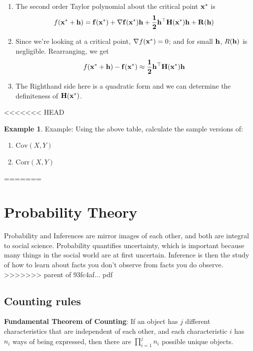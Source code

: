 \documentclass[]{book}
\providecommand{\tightlist}{%
  \setlength{\itemsep}{0pt}\setlength{\parskip}{0pt}}
\theoremstyle{definition}
\theoremstyle{definition}
\newtheorem{example}{Example}[chapter]
\theoremstyle{definition}
\theoremstyle{remark}
\begin{document}
\begin{enumerate}
\def\labelenumi{\arabic{enumi}.}
\tightlist
\item
  The second order Taylor polynomial about the critical point
  \({\bf x}^*\) is
  \[f({\bf x}^*+\bf h)=f({\bf x}^*)+\nabla f({\bf x}^*) \bf h +\frac{1}{2} \bf h^\top
  {\bf H(x^*)} \bf h + R(\bf h)\]
\item
  Since we're looking at a critical point, \(\nabla f({\bf x}^*)=0\);
  and for small \(\bf h\), \(R(\bf h)\) is negligible. Rearranging, we get
  \[f({\bf x}^*+\bf h)-f({\bf x}^*)\approx \frac{1}{2} \bf h^\top {\bf H(x^*)}
  \bf h \]
\item
  The Righthand side here is a quadratic form and we can determine the definiteness of \(\bf H(x^*)\).
\end{enumerate}

<<<<<<< HEAD
\begin{example}
\protect\hypertarget{exm:unnamed-chunk-94}{}{\label{exm:unnamed-chunk-94} }Example: Using the above table, calculate the sample versions of:

\begin{enumerate}
\def\labelenumi{\arabic{enumi}.}
\tightlist
\item
  \(\text{Cov}(X,Y)\)
\item
  \(\text{Corr}(X, Y)\)
\end{enumerate}
\end{example}
=======
\hypertarget{probability-theory}{%
\chapter{Probability Theory}\label{probability-theory}}

Probability and Inferences are mirror images of each other, and both are integral to social science. Probability quantifies uncertainty, which is important because many things in the social world are at first uncertain. Inference is then the study of how to learn about facts you don't observe from facts you do observe.
>>>>>>> parent of 93fc4af... pdf

\hypertarget{counting-rules}{%
\section{Counting rules}\label{counting-rules}}

\textbf{Fundamental Theorem of Counting}: If an object has \(j\) different characteristics that are independent of each other, and each characteristic \(i\) has \(n_i\) ways of being expressed, then there are \(\prod_{i = 1}^j n_i\) possible unique objects.
\end{document}
